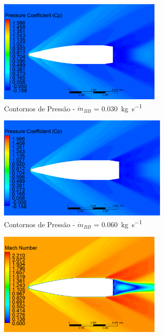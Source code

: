 \begin{figure}[!ht]
	\centering
	\begin{subfigure}[b]{0.47\textwidth}
        \centering
        \includegraphics[height=5cm,width=\textwidth]{contorno-pressao-2306K-vazao-0030-2pol.png}
        \caption{Contornos de Pressão - \(\Dot{m}_{BB}\) = \qty{0,030}{\kilogram\per\second}}
        \label{fig:contorno-pressao-bb-2pol-vazao-0030}
    \end{subfigure}
    \hfill
    \begin{subfigure}[b]{0.47\textwidth}
        \centering
        \includegraphics[height=5cm,width=\textwidth]{contorno-pressao-2306K-vazao-0060-2pol.png}
        \caption{Contornos de Pressão - \(\Dot{m}_{BB}\) = \qty{0,060}{\kilogram\per\second}}
        \label{fig:contorno-pressao-bb-2pol-vazao-0060}
    \end{subfigure}
    \hfill
    \begin{subfigure}[b]{0.47\textwidth}
        \centering
        \includegraphics[height=5cm,width=\textwidth]{contorno-velocidade-2306K-vazao-0030-2pol.png}

\end{subfigure}
\end{figure}

